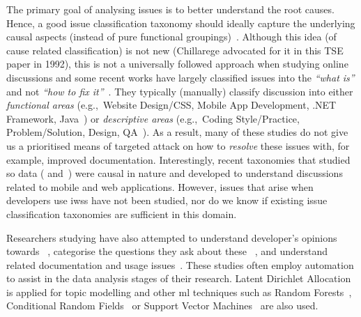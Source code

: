 The primary goal of analysing issues is to better understand the root causes. Hence, a good issue classification taxonomy should ideally capture the underlying causal aspects (instead of pure functional groupings)~\citep{Chillarege:1992tm}. Although this idea (of cause related classification) is not new (Chillarege advocated for it in this TSE paper in 1992), this is not a universally followed approach when studying online discussions and some recent works have largely classified issues into the \textit{``what is''} and not \textit{``how to fix it''}~\citep{Barua:2012gz,Beyer:2014ec,Uddin:2019cz}. They typically (manually) classify discussion into either \textit{functional areas} (e.g.,~Website Design/CSS, Mobile App Development, .NET Framework, Java~\citep{Barua:2012gz}) or \textit{descriptive areas} (e.g.,~Coding Style/Practice, Problem/Solution, Design, QA~\citep{Barua:2012gz,Uddin:2019cz}). As a result, many of these studies do not give us a prioritised means of targeted attack on how to \textit{resolve} these issues with, for example, improved documentation. Interestingly, recent taxonomies that studied \gls{so} data (\citet{Aghajani:2019bo} and~\citet{Beyer:2018fm}) were causal in nature and developed to understand discussions related to mobile and web applications.  However, issues that arise when developers use \glspl{iws} have not been studied, nor do we know if existing issue classification taxonomies are sufficient in this domain.

Researchers studying  have also attempted to understand developer's opinions towards ~\citep{Uddin:2019cz}, categorise the questions they ask about these ~\citep{Rosen:2016uk,Barzilay:2013cn,Barua:2012gz,Beyer:2018fm}, and understand  related documentation and usage issues~\citep{Tahir:2018ks,Ahasanuzzaman:2018kv,Hou:2013jf,Aghajani:2019bo,Barua:2012gz,Allamanis:2013is}. These studies often employ automation to assist in the data analysis stages of their research. Latent Dirichlet Allocation~\citep{Uddin:2019cz,Barua:2012gz,Rosen:2016uk,Allamanis:2013is} is applied for topic modelling and other \gls{ml} techniques such as Random Forests~\citep{Beyer:2018fm}, Conditional Random Fields~\citep{Ahasanuzzaman:2018kv} or Support Vector Machines~\citep{Hou:2013jf,Beyer:2018fm} are also used.

